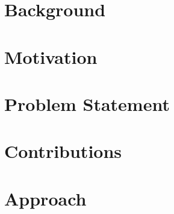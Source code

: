 \documentclass[a4paper,10pt,table,xcdraw]{thesis}
\author{Prasannjeet Singh}
\begin{document}
	\AddToShipoutPicture*{\BackgroundPic}
	\AddToShipoutPicture*{\BackgroundPicLogo}
	\maketitle
	\restoregeometry
	\clearpage
	
	\renewcommand*\contentsname{Table of Contents}
	\tableofcontents %
	\newpage
	
	\setmainfont[
	BoldFont={Charter Bold}, 
	ItalicFont={Charter Italic},
	]{Charter}
	
	\chapter{Background}
	
	\newpage
	
	\chapter{Motivation}
	
	\newpage
	
	\chapter{Problem Statement}
	
	\newpage
	
	\chapter{Contributions}
	
	\newpage
	
	\chapter{Approach}
	
	\newpage
	
\end{document}
